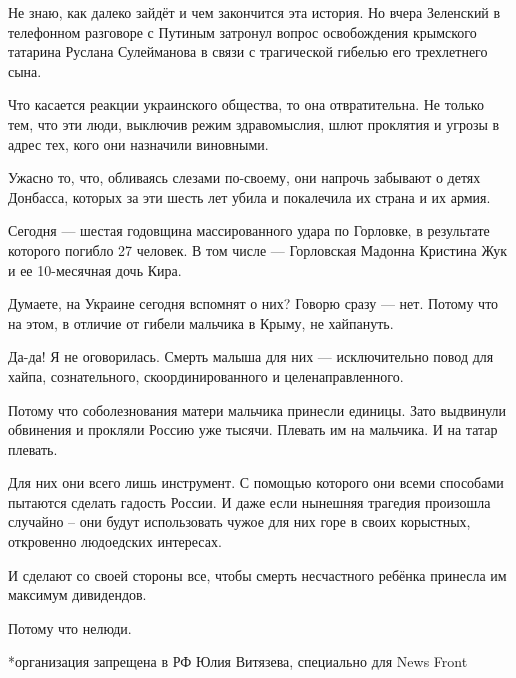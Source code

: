Не знаю, как далеко зайдёт и чем закончится эта история.  Но вчера Зеленский в
телефонном разговоре с Путиным затронул вопрос освобождения крымского татарина
Руслана Сулейманова в связи с трагической гибелью его трехлетнего сына.

Что касается реакции украинского общества, то она отвратительна. Не только тем,
что эти люди, выключив режим здравомыслия, шлют проклятия и угрозы в адрес тех,
кого они назначили виновными.

Ужасно то, что, обливаясь слезами по-своему, они напрочь забывают о детях
Донбасса, которых за эти шесть лет убила и покалечила их страна и их армия.

Сегодня — шестая годовщина массированного удара по Горловке, в результате
которого погибло 27 человек.  В том числе — Горловская Мадонна Кристина Жук и
ее 10-месячная дочь Кира.

Думаете, на Украине сегодня вспомнят о них?  Говорю сразу — нет.  Потому что на
этом, в отличие от гибели мальчика в Крыму, не хайпануть.

Да-да! Я не оговорилась.  Смерть малыша для них — исключительно повод для
хайпа, сознательного, скоординированного и целенаправленного.

Потому что соболезнования матери мальчика принесли единицы. Зато выдвинули
обвинения и прокляли Россию уже тысячи.  Плевать им на мальчика.  И на татар
плевать.

Для них они всего лишь инструмент.  С помощью которого они всеми способами
пытаются сделать гадость России.  И даже если нынешняя трагедия произошла
случайно – они будут использовать чужое для них горе в своих корыстных,
откровенно людоедских интересах.

И сделают со своей стороны все, чтобы смерть несчастного ребёнка принесла им
максимум дивидендов.

Потому что нелюди.

*организация запрещена в РФ Юлия Витязева, специально для News Front
  
